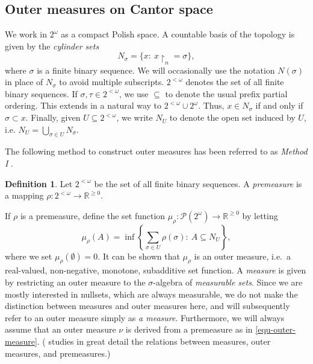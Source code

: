 \documentclass[11pt,reqno]{article}
\theoremstyle{plain}
\theoremstyle{definition}
\newtheorem{defn}{Definition}
\theoremstyle{remark}
\numberwithin{equation}{section}
\newcommand{\Cant}{\ensuremath{2^{\omega}}}
\newcommand{\Str}[1][<\omega]{\ensuremath{2^{#1}}}
\newcommand{\Sle}{\ensuremath{\subset}}
\newcommand{\Sleq}{\ensuremath{\subseteq}}
\newcommand{\Cyl}[1]{\ensuremath{N_{#1}}}
\newcommand{\Acyl}[1]{\ensuremath{N(#1)}}
\newcommand{\Rest}[1]{\ensuremath{\!\restriction_{#1}}}
\begin{document}
%
%
\subsection{Outer measures on Cantor space}

We work in $\Cant$ as a compact Polish space. A countable basis of the topology is given by the \emph{cylinder sets}
\[
	N_\sigma = \{ x : \: x\Rest{n} = \sigma\},
\]
where $\sigma$ is a finite binary sequence. We will occasionally use the notation $\Acyl{\sigma}$ in place of $\Cyl{\sigma}$ to avoid multiple subscripts. $\Str$ denotes the set of all finite binary sequences. If $\sigma, \tau \in \Str$, we use $\Sleq$ to denote the usual prefix partial ordering. This extends in a natural way to $\Str \cup \Cant$. Thus, $x \in \Cyl{\sigma}$ if and only if $\sigma \Sle x$. Finally, given $U \subseteq \Str$, we write $\Cyl{U}$ to denote the open set induced by $U$, i.e. $\Cyl{U} = \bigcup_{\sigma \in U} \Cyl{\sigma}$.

The following method to construct outer measures has been referred to as \emph{Method I} \citep{munroe:1953, rogers:1970}.

\begin{defn}
Let $\Str$ be the set of all finite binary sequences. A \emph{premeasure} is a mapping $\rho: \Str \to \mathbb{R}^{\geq 0}$.
\end{defn}
	
If $\rho$ is a premeasure, define the set function $\mu_\rho: \mathcal{P}(\Cant) \to \mathbb{R}^{\geq 0}$ by letting
	\begin{equation} \label{equ-outer-measure}
		\mu_\rho(A) = \inf \left\{ \sum_{\sigma \in U} \rho(\sigma) : \: A \subseteq  N_U \right\},
	\end{equation}
where we set $\mu_\rho(\emptyset) = 0$.
It can be shown that $\mu_\rho$ is an outer measure, i.e.\ a real-valued, non-negative, monotone, subadditive set function. A \emph{measure} is given by restricting an outer measure to the $\sigma$-algebra of \emph{measurable sets}. Since we are mostly interested in nullsets, which are always measurable, we do not make the distinction between measures and outer measures here, and will subsequently refer to an outer measure simply as \emph{a measure}.
Furthermore, we will always assume that an outer measure $\nu$ is derived from a premeasure as in \eqref{equ-outer-measure}. (\citet{rogers:1970} studies in great detail the relations between measures, outer measures, and premeasures.)
\end{document}
